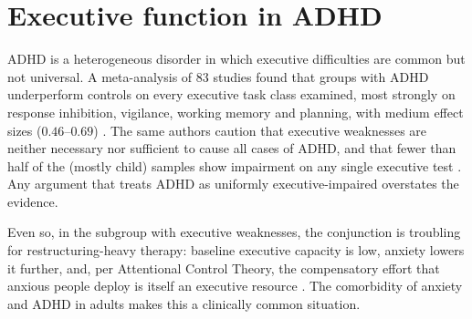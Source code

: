 \section{Executive function in ADHD}\label{sec:adhd}
ADHD is a heterogeneous disorder in which executive difficulties are common but not universal. A meta-analysis of 83 studies found that groups with ADHD underperform controls on every executive task class examined, most strongly on response inhibition, vigilance, working memory and planning, with medium effect sizes ($0.46$--$0.69$) \citep{willcutt2005ef}. The same authors caution that executive weaknesses are neither necessary nor sufficient to cause all cases of ADHD, and that fewer than half of the (mostly child) samples show impairment on any single executive test \citep{willcutt2005ef}. Any argument that treats ADHD as uniformly executive-impaired overstates the evidence.

Even so, in the subgroup with executive weaknesses, the conjunction is troubling for restructuring-heavy therapy: baseline executive capacity is low, anxiety lowers it further, and, per Attentional Control Theory, the compensatory effort that anxious people deploy is itself an executive resource \citep{eysenck2007act}. The comorbidity of anxiety and ADHD in adults makes this a clinically common situation.

